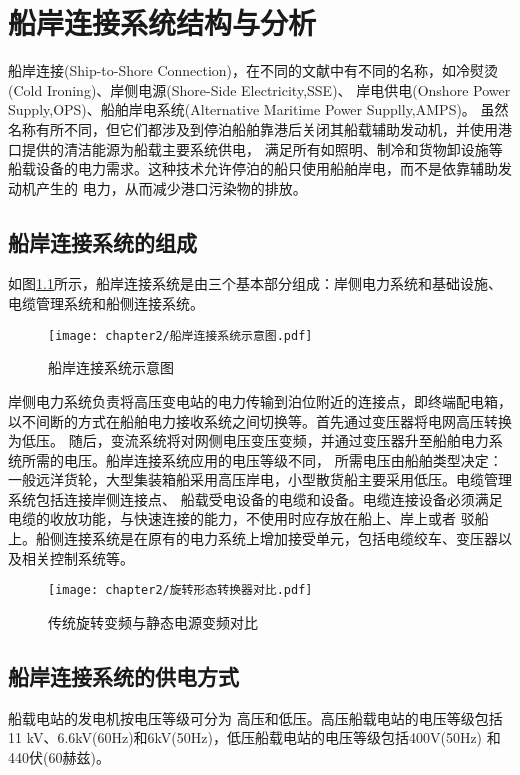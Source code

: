 \chapter{船岸连接系统结构与分析}

船岸连接(Ship-to-Shore Connection)，在不同的文献中有不同的名称，如冷熨烫(Cold Ironing)、岸侧电源(Shore-Side Electricity,SSE)、
岸电供电(Onshore Power Supply,OPS)、船舶岸电系统(Alternative Maritime Power Supplly,AMPS)。
虽然名称有所不同，但它们都涉及到停泊船舶靠港后关闭其船载辅助发动机，并使用港口提供的清洁能源为船载主要系统供电，
满足所有如照明、制冷和货物卸设施等船载设备的电力需求。这种技术允许停泊的船只使用船舶岸电，而不是依靠辅助发动机产生的
电力，从而减少港口污染物的排放。

\section{船岸连接系统的组成}

如图\ref{fig:船岸连接系统示意图}所示，船岸连接系统是由三个基本部分组成：岸侧电力系统和基础设施、电缆管理系统和船侧连接系统。

\begin{figure}[!htp]
	\centering
	\texttt{[image: chapter2/船岸连接系统示意图.pdf]}
	\caption{船岸连接系统示意图}
	\label{fig:船岸连接系统示意图}
\end{figure}

岸侧电力系统负责将高压变电站的电力传输到泊位附近的连接点，即终端配电箱，以不间断的方式在船舶电力接收系统之间切换等。首先通过变压器将电网高压转换为低压。
随后，变流系统将对网侧电压变压变频，并通过变压器升至船舶电力系统所需的电压。船岸连接系统应用的电压等级不同，
所需电压由船舶类型决定：一般远洋货轮，大型集装箱船采用高压岸电，小型散货船主要采用低压。电缆管理系统包括连接岸侧连接点、
船载受电设备的电缆和设备。电缆连接设备必须满足电缆的收放功能，与快速连接的能力，不使用时应存放在船上、岸上或者
驳船上。船侧连接系统是在原有的电力系统上增加接受单元，包括电缆绞车、变压器以及相关控制系统等。

\begin{figure}[!htp]
	\centering
	\texttt{[image: chapter2/旋转形态转换器对比.pdf]}
	\caption{传统旋转变频与静态电源变频对比}
	\label{fig:传统旋转变频与静态电源变频对比}
\end{figure}

\section{船岸连接系统的供电方式}
船载电站的发电机按电压等级可分为
高压和低压。高压船载电站的电压等级包括11 kV、6.6kV(60Hz)和6kV(50Hz)，低压船载电站的电压等级包括400V(50Hz)
和440伏(60赫兹)。

